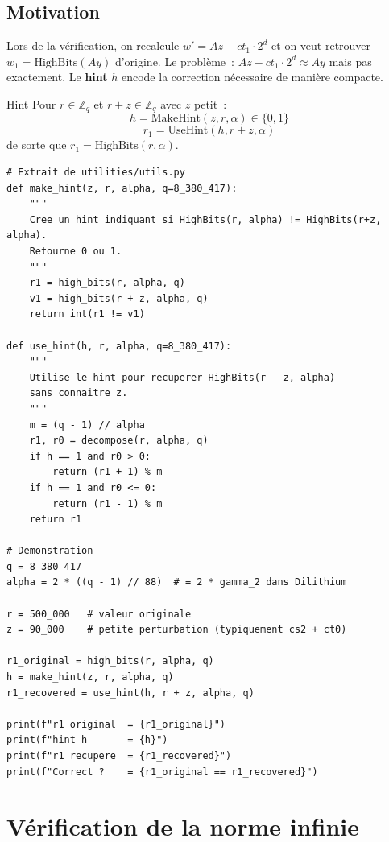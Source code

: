 \documentclass[12pt, a4paper]{article}
\newcommand{\ZZ}{\mathbb{Z}}
\begin{document}
\subsection{Motivation}

Lors de la vérification, on recalcule $w' = Az - ct_1 \cdot 2^d$ et on
veut retrouver $w_1 = \mathrm{HighBits}(Ay)$ d'origine.
Le problème~: $Az - ct_1 \cdot 2^d \approx Ay$ mais pas exactement.
Le \textbf{hint} $h$ encode la correction nécessaire de manière compacte.

\begin{defbox}{Hint}
Pour $r \in \ZZ_q$ et $r + z \in \ZZ_q$ avec $z$ petit~:
$$h = \mathrm{MakeHint}(z, r, \alpha) \in \{0, 1\}$$
$$r_1 = \mathrm{UseHint}(h, r + z, \alpha)$$
de sorte que $r_1 = \mathrm{HighBits}(r, \alpha)$.
\end{defbox}

\begin{lstlisting}[style=python]
# Extrait de utilities/utils.py
def make_hint(z, r, alpha, q=8_380_417):
    """
    Cree un hint indiquant si HighBits(r, alpha) != HighBits(r+z, alpha).
    Retourne 0 ou 1.
    """
    r1 = high_bits(r, alpha, q)
    v1 = high_bits(r + z, alpha, q)
    return int(r1 != v1)

def use_hint(h, r, alpha, q=8_380_417):
    """
    Utilise le hint pour recuperer HighBits(r - z, alpha)
    sans connaitre z.
    """
    m = (q - 1) // alpha
    r1, r0 = decompose(r, alpha, q)
    if h == 1 and r0 > 0:
        return (r1 + 1) % m
    if h == 1 and r0 <= 0:
        return (r1 - 1) % m
    return r1

# Demonstration
q = 8_380_417
alpha = 2 * ((q - 1) // 88)  # = 2 * gamma_2 dans Dilithium

r = 500_000   # valeur originale
z = 90_000    # petite perturbation (typiquement cs2 + ct0)

r1_original = high_bits(r, alpha, q)
h = make_hint(z, r, alpha, q)
r1_recovered = use_hint(h, r + z, alpha, q)

print(f"r1 original  = {r1_original}")
print(f"hint h       = {h}")
print(f"r1 recupere  = {r1_recovered}")
print(f"Correct ?    = {r1_original == r1_recovered}")
\end{lstlisting}

\section{Vérification de la norme infinie}
\end{document}

